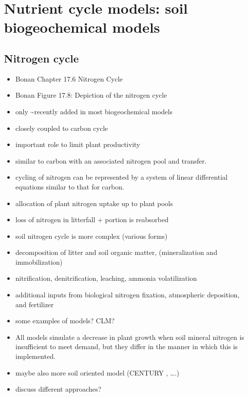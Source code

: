 \documentclass[12pt,oneside]{book}
\begin{document}
\section{Nutrient cycle models: soil biogeochemical
models}\label{nutrient-cycle-models-soil-biogeochemical-models}

\subsection{Nitrogen cycle}\label{nitrogen-cycle}

\begin{itemize}
\item
  Bonan Chapter 17.6 Nitrogen Cycle
\item
  Bonan Figure 17.8: Depiction of the nitrogen cycle
\item
  only \textasciitilde{}recently added in most biogeochemical models
\item
  closely coupled to carbon cycle
\item
  important role to limit plant productivity
\item
  similar to carbon with an associated nitrogen pool and transfer.
\item
  cycling of nitrogen can be represented by a system of linear
  differential equations similar to that for carbon.
\item
  allocation of plant nitrogen uptake up to plant pools
\item
  loss of nitrogen in litterfall + portion is reabsorbed
\item
  soil nitrogen cycle is more complex (various forms)
\item
  decomposition of litter and soil organic matter, (mineralization and
  immobilization)
\item
  nitrification, denitrification, leaching, ammonia volatilization
\item
  additional inputs from biological nitrogen fixation, atmospheric
  deposition, and fertilizer
\item
  some examples of models? CLM?
\item
  All models simulate a decrease in plant growth when soil mineral
  nitrogen is insufficient to meet demand, but they differ in the manner
  in which this is implemented.
\item
  maybe also more soil oriented model (CENTURY , \ldots{}.)
\item
  discuss different approaches?
\end{itemize}
\end{document}
